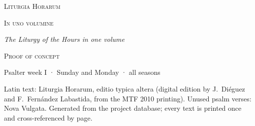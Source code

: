 

\frontmatter
\thispagestyle{empty}
\vspace*{1.6in}
{\centering
{\Huge\scshape\color{rubric}Liturgia Horarum\par}
\vspace{0.6em}
{\Large\scshape In uno volumine\par}
\vspace{1.4em}
{\large\itshape\foreignlanguage{english}{The Liturgy of the Hours in one volume}\par}
\vspace{2.4em}
{\small\scshape\foreignlanguage{english}{Proof of concept}\par}
{\small\foreignlanguage{english}{Psalter week I · Sunday and Monday · all seasons}\par}
\vfill
{\footnotesize\foreignlanguage{english}{Latin text: Liturgia Horarum, editio typica altera (digital edition by
J.~Diéguez and F.~Fernández Labastida, from the MTF 2010 printing). Unused psalm verses: Nova Vulgata.
Generated from the project database; every text is printed once and cross-referenced by page.}\par}
}
\clearpage
\foreignlanguage{english}{\tableofcontents*}
\mainmatter


